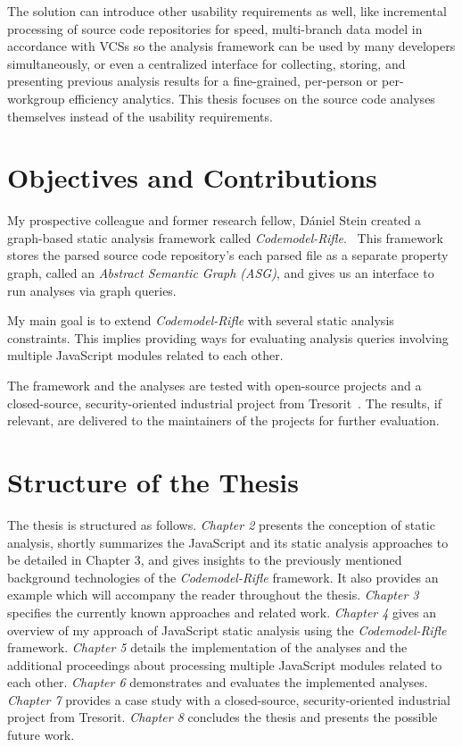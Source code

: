The solution can introduce other usability requirements as well, like incremental processing of source code repositories for speed, multi-branch data model in accordance with VCSs so the analysis framework can be used by many developers simultaneously, or even a centralized interface for collecting, storing, and presenting previous analysis results for a fine-grained, per-person or per-workgroup efficiency analytics. This thesis focuses on the source code analyses themselves instead of the usability requirements.


\section{Objectives and Contributions}

My prospective colleague and former research fellow, Dániel Stein created a graph-based static analysis framework called \emph{Codemodel-Rifle}.~\cite{stein-daniel-msc} This framework stores the parsed source code repository's each parsed file as a separate property graph, called an \emph{Abstract Semantic Graph (ASG)}, and gives us an interface to run analyses via graph queries.

My main goal is to extend \emph{Codemodel-Rifle} with several static analysis constraints. This implies providing ways for evaluating analysis queries involving multiple JavaScript modules related to each other.

The framework and the analyses are tested with open-source projects and a closed-source, security-oriented industrial project from Tresorit~\cite{tresorit}. The results, if relevant, are delivered to the maintainers of the projects for further evaluation.


\section{Structure of the Thesis}

The thesis is structured as follows. \emph{Chapter 2} presents the conception of static analysis, shortly summarizes the JavaScript and its static analysis approaches to be detailed in Chapter 3, and gives insights to the previously mentioned background technologies of the \emph{Codemodel-Rifle} framework. It also provides an example which will accompany the reader throughout the thesis. \emph{Chapter 3} specifies the currently known approaches and related work. \emph{Chapter 4} gives an overview of my approach of JavaScript static analysis using the \emph{Codemodel-Rifle} framework. \emph{Chapter 5} details the implementation of the analyses and the additional proceedings about processing multiple JavaScript modules related to each other. \emph{Chapter 6} demonstrates and evaluates the implemented analyses. \emph{Chapter 7} provides a case study with a closed-source, security-oriented industrial project from Tresorit. \emph{Chapter 8} concludes the thesis and presents the possible future work.

